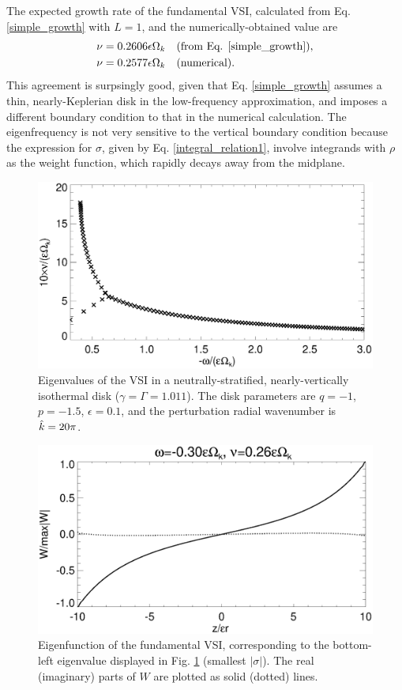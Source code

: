 The expected growth rate of the fundamental VSI, calculated from
Eq. \ref{simple_growth} with $L=1$, and the numerically-obtained value
are  
\begin{align*}
  \nu = 0.2606\epsilon\Omega_k &\quad \text{(from
    Eq. \ref{simple_growth})},\\
  \nu = 0.2577 \epsilon \Omega_k &\quad \text{(numerical)}.
\end{align*}
This agreement is surpsingly good, given that
Eq. \ref{simple_growth} assumes a thin, nearly-Keplerian disk in the 
low-frequency approximation, and
imposes a different boundary condition to that in the numerical
calculation. The eigenfrequency is not very sensitive to the vertical boundary
condition because the expression for $\sigma$, given by
Eq. \ref{integral_relation1}, involve integrands with $\rho$ as the 
weight function, which rapidly decays away from the midplane.

\begin{figure}
  \includegraphics[width=\linewidth]{figures/eigenvalues_iso}
  \caption{Eigenvalues of the VSI in a neutrally-stratified,
    nearly-vertically isothermal disk  ($\gamma=\Gamma=1.011$). The
    disk parameters are $q=-1$, $p=-1.5$, $\epsilon=0.1$, and the perturbation radial
    wavenumber is $\hat{k}=20\pi$. \label{lowfreq_eigen}
  }
\end{figure}

\begin{figure}
  \includegraphics[width=\linewidth]{figures/eigenvector_iso}
  \caption{Eigenfunction of the fundamental VSI,
    corresponding to the bottom-left eigenvalue displayed in
    Fig. \ref{lowfreq_eigen} (smallest $|\sigma|$). The real
    (imaginary) parts of $W$ are plotted as solid (dotted) lines. 
    \label{lowfreq_eigenfunc}
  }
\end{figure}

